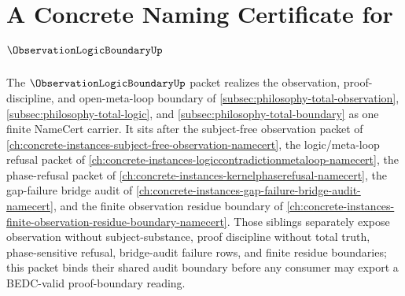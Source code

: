 \chapter{A Concrete Naming Certificate for $\ObservationLogicBoundaryUp$}
\label{ch:concrete-instances-observation-logic-boundary-namecert}

The $\ObservationLogicBoundaryUp$ packet realizes the observation, proof-discipline, and open-meta-loop boundary of \autoref{subsec:philosophy-total-observation}, \autoref{subsec:philosophy-total-logic}, and \autoref{subsec:philosophy-total-boundary} as one finite NameCert carrier. It sits after the subject-free observation packet of \autoref{ch:concrete-instances-subject-free-observation-namecert}, the logic/meta-loop refusal packet of \autoref{ch:concrete-instances-logiccontradictionmetaloop-namecert}, the phase-refusal packet of \autoref{ch:concrete-instances-kernelphaserefusal-namecert}, the gap-failure bridge audit of \autoref{ch:concrete-instances-gap-failure-bridge-audit-namecert}, and the finite observation residue boundary of \autoref{ch:concrete-instances-finite-observation-residue-boundary-namecert}. Those siblings separately expose observation without subject-substance, proof discipline without total truth, phase-sensitive refusal, bridge-audit failure rows, and finite residue boundaries; this packet binds their shared audit boundary before any consumer may export a BEDC-valid proof-boundary reading.

